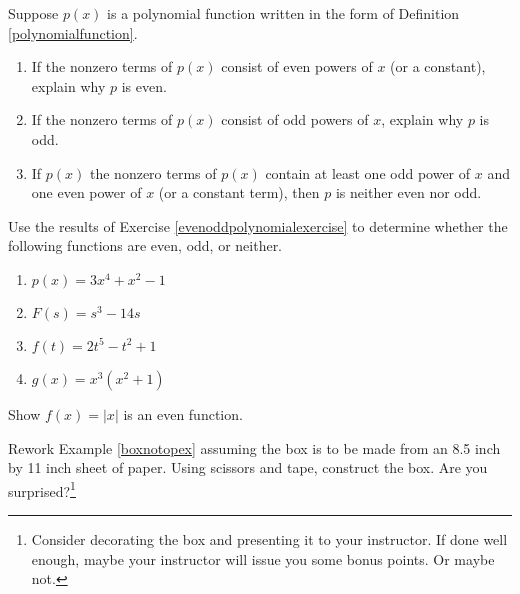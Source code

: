 \documentclass{ximera}
\begin{document}
\begin{problem}\label{evenoddpolynomialexercise}
Suppose $p(x)$ is a polynomial function written in the form of  Definition \ref{polynomialfunction}.

\begin{enumerate}

\item  If the nonzero terms of $p(x)$ consist of even powers of $x$ (or a constant), explain why $p$ is even.

\item   If the nonzero terms of $p(x)$ consist of odd powers of $x$, explain why $p$ is odd.

\item  If $p(x)$ the nonzero terms of $p(x)$  contain at least one odd power of $x$ and one even power of $x$ (or a constant term), then $p$ is neither even nor odd.

\end{enumerate}
\end{problem}


\begin{problem}
Use the results of Exercise \ref{evenoddpolynomialexercise} to determine whether the following functions are even, odd, or neither.

\begin{enumerate}
    \item $p(x) = 3x^4 + x^2 - 1$

    \item $F(s) = s^3 - 14s$

    \item $f(t) = 2t^5 - t^2 + 1$

    \item $g(x) =x^3(x^2+1)$
\end{enumerate}
\end{problem}



\begin{problem}
Show $f(x) = |x|$ is an even function.
\end{problem}

\begin{problem}
Rework Example \ref{boxnotopex} assuming the box is to be made from an 8.5 inch by 11 inch sheet of paper. Using scissors and tape, construct the box.  Are you surprised?\footnote{Consider decorating the box and presenting it to your instructor. If done well enough, maybe your instructor will issue you some bonus points.  Or maybe not.}
\end{problem}
\end{document}
